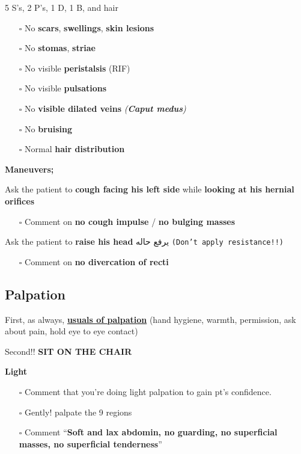 \documentclass[
  13.5pt,
  a4paper,
  DIV=11,
  numbers=noendperiod]{scrreprt}
\providecommand{\tightlist}{%
  \setlength{\itemsep}{0pt}\setlength{\parskip}{0pt}}
\begin{document}
5 S's, 2 P's, 1 D, 1 B, and hair

\begin{itemize}
\tightlist
\item[$\square$]
  No \textbf{scars}, \textbf{swellings}, \textbf{skin lesions}
\item[$\square$]
  No \textbf{stomas}, \textbf{striae}
\item[$\square$]
  No visible \textbf{peristalsis} (RIF)
\item[$\square$]
  No visible \textbf{pulsations}
\item[$\square$]
  No \textbf{visible dilated veins} \emph{(\textbf{Caput medus})}
\item[$\square$]
  No \textbf{bruising}
\item[$\square$]
  Normal \textbf{hair distribution}
\end{itemize}

\textbf{Maneuvers;}

Ask the patient to \textbf{cough facing his left side} while
\textbf{looking at his hernial orifices}

\begin{itemize}
\tightlist
\item[$\square$]
  Comment on \textbf{no cough impulse} / \textbf{no bulging masses}
\end{itemize}

Ask the patient to \textbf{raise his head} يرفع حاله
\texttt{(Don’t\ apply\ resistance!!)}

\begin{itemize}
\tightlist
\item[$\square$]
  Comment on \textbf{no divercation of recti}
\end{itemize}

\subsection{Palpation}\label{palpation-2}

First, as always, \textbf{\href{miscellaneous.qmd}{usuals of palpation}}
(hand hygiene, warmth, permission, ask about pain, hold eye to eye
contact)

Second!! \textbf{SIT ON THE CHAIR}

\textbf{Light}

\begin{itemize}
\tightlist
\item[$\square$]
  Comment that you're doing light palpation to gain pt's confidence.
\item[$\square$]
  Gently! palpate the 9 regions
\item[$\square$]
  Comment ``\textbf{Soft and lax abdomin, no guarding, no superficial
  masses, no superficial tenderness}''
\end{itemize}
\end{document}
